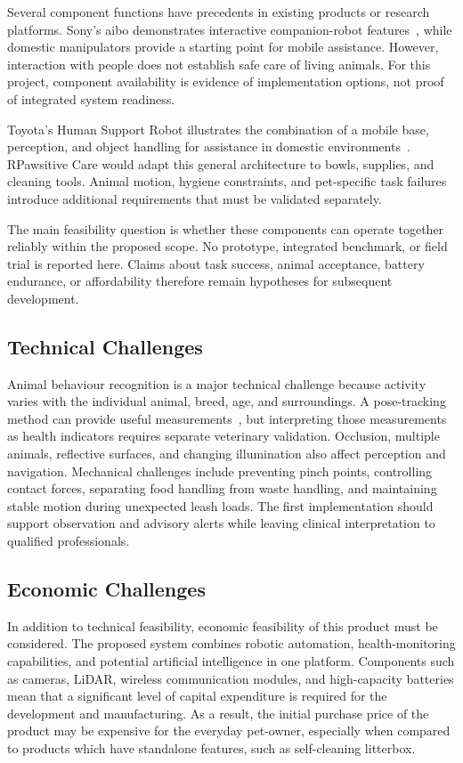 \documentclass[conference,letterpaper]{IEEEtran}
\begin{document}
Several component functions have precedents in existing products or research platforms. Sony's aibo demonstrates interactive companion-robot features~\cite{sony}, while domestic manipulators provide a starting point for mobile assistance. However, interaction with people does not establish safe care of living animals. For this project, component availability is evidence of implementation options, not proof of integrated system readiness.

Toyota's Human Support Robot illustrates the combination of a mobile base, perception, and object handling for assistance in domestic environments~\cite{toyota}. RPawsitive Care would adapt this general architecture to bowls, supplies, and cleaning tools. Animal motion, hygiene constraints, and pet-specific task failures introduce additional requirements that must be validated separately.

The main feasibility question is whether these components can operate together reliably within the proposed scope. No prototype, integrated benchmark, or field trial is reported here. Claims about task success, animal acceptance, battery endurance, or affordability therefore remain hypotheses for subsequent development.

\subsection{Technical Challenges}

Animal behaviour recognition is a major technical challenge because activity varies with the individual animal, breed, age, and surroundings. A pose-tracking method can provide useful measurements~\cite{deeplabcut}, but interpreting those measurements as health indicators requires separate veterinary validation. Occlusion, multiple animals, reflective surfaces, and changing illumination also affect perception and navigation. Mechanical challenges include preventing pinch points, controlling contact forces, separating food handling from waste handling, and maintaining stable motion during unexpected leash loads. The first implementation should support observation and advisory alerts while leaving clinical interpretation to qualified professionals.

\subsection{Economic Challenges}

In addition to technical feasibility, economic feasibility of this product must be considered. The proposed system combines robotic automation, health-monitoring capabilities, and potential artificial intelligence in one platform. Components such as cameras, LiDAR, wireless communication modules, and high-capacity batteries mean that a significant level of capital expenditure is required for the development and manufacturing. As a result, the initial purchase price of the product may be expensive for the everyday pet-owner, especially when compared to products which have standalone features, such as self-cleaning litterbox.
\end{document}
